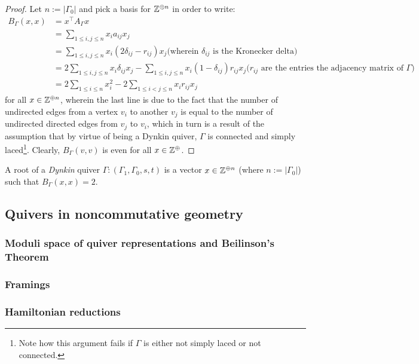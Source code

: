                 \begin{proof}
                    Let $n := |\Gamma_0|$ and pick a basis for $\mathbb{Z}^{\oplus n}$ in order to write:
                        $$
                            \begin{aligned}
                                B_{\Gamma}(x, x) & = x^{\top} A_{\Gamma} x
                                \\
                                & = \sum_{1 \leq i, j \leq n} x_i a_{ij} x_j
                                \\
                                & = \sum_{1 \leq i, j \leq n} x_i (2\delta_{ij} - r_{ij}) x_j \text{(wherein $\delta_{ij}$ is the Kronecker delta)}
                                \\
                                & = 2\sum_{1 \leq i, j \leq n} x_i \delta_{ij} x_j - \sum_{1 \leq i, j \leq n} x_i (1 - \delta_{ij}) r_{ij} x_j \text{($r_{ij}$ are the entries the adjacency matrix of $\Gamma$)}
                                \\
                                & = 2\sum_{1 \leq i \leq n} x_i^2 - 2\sum_{1 \leq i < j \leq n} x_i r_{ij} x_j
                            \end{aligned}
                        $$
                    for all $x \in \mathbb{Z}^{\oplus n}$, wherein the last line is due to the fact that the number of undirected edges from a vertex $v_i$ to another $v_j$ is equal to the number of undirected directed edges from $v_j$ to $v_i$, which in turn is a result of the assumption that by virtue of being a Dynkin quiver, $\Gamma$ is connected and simply laced\footnote{Note how this argument fails if $\Gamma$ is either not simply laced or not connected.}. Clearly, $B_{\Gamma}(v, v)$ is even for all $x \in \mathbb{Z}^{\oplus}$.
                \end{proof}
            \begin{definition}[Roots] \label{def: roots_of_dynkin_quivers}
                A root of a \textit{Dynkin} quiver $\Gamma : (\Gamma_1, \Gamma_0, s, t)$ is a vector $x \in \mathbb{Z}^{\oplus n}$ (where $n := |\Gamma_0|$) such that $B_{\Gamma}(x, x) = 2$.
            \end{definition}
        
    \subsection{Quivers in noncommutative geometry}
        \subsubsection{Moduli space of quiver representations and Beilinson's Theorem}
        
        \subsubsection{Framings}
        
        \subsubsection{Hamiltonian reductions}